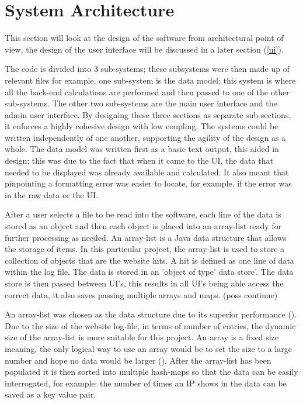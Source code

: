 \section{System Architecture}

This section will look at the design of the software from architectural point of view, the design of the user interface will be discussed in a later section (\ref{ui}). 

The code is divided into 3 sub-systems; these subsystems were then made up of relevant files for example, one sub-system is the data model; this system is where all the back-end calculations are performed and then passed to one of the other sub-systems. The other two sub-systems are the main user interface and the admin user interface. By designing these three sections as separate sub-sections, it enforces a highly cohesive design with low coupling. The systems could be written independently of one another, supporting the agility of the design as a whole. The data model was written first as a basic text output, this aided in design; this was due to the fact that when it came to the UI, the data that needed to be displayed was already available and calculated. It also meant that pinpointing a formatting error was easier to locate, for example, if the error was in the raw data or the UI. 

After a user selects a file to be read into the software, each line of the data is stored as an object and then each object is placed into an array-list ready for further processing as needed. An array-list is a Java data structure that allows the storage of items. In this particular project, the array-list is used to store a collection of objects that are the website hits. A hit is defined as one line of data within the log file. The data is stored in an 'object of type' data store'. The data store is then passed between UI's, this results in all UI's being able access the correct data, it also saves passing multiple arrays and maps. (poss continue)

An array-list was chosen as the data structure due to its superior performance (\cite{JavaAL}). Due to the size of the website log-file, in terms of number of entries, the dynamic size of the array-list is more suitable for this project. An array is a fixed size meaning, the only logical way to use an array would be to set the size to a large number and hope no data would be larger (\cite{Array}). After the array-list has been populated it is then sorted into multiple hash-maps so that the data can be easily interrogated, for example: the number of times an IP shows in the data can be saved as a key value pair. 


